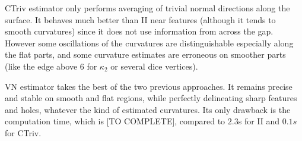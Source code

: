 \documentclass[runningheads]{llncs}
\begin{document}
    CTriv estimator only performs averaging of trivial normal
    directions along the surface. It behaves much better than II near
    features (although it tends to smooth curvatures) since it does
    not use information from across the gap. However some oscillations
    of the curvatures are distinguishable especially along the flat
    parts, and some curvature estimates are erroneous on smoother
    parts (like the edge above 6 for $\kappa_2$ or several dice
    vertices).

    VN estimator takes the best of the two previous approaches. It
    remains precise and stable on smooth and flat regions, while
    perfectly delineating sharp features and holes, whatever the kind
    of estimated curvatures. Its only drawback is the computation
    time, which is [TO COMPLETE], compared to $2.3$s for II and $0.1s$
    for CTriv.


    \newcommand{\MyZoom}[1]{%
        \begin{tikzpicture}[spy using outlines={circle,magnification=1.8,size=2cm,connect spies}]
        \node[inner sep=0pt] {\pgfimage[width=0.3\textwidth]{#1}};
        \spy[overlay,blue] on (0.4,0.2) in node at (-0.8,0.8);
        \end{tikzpicture}}
\end{document}
